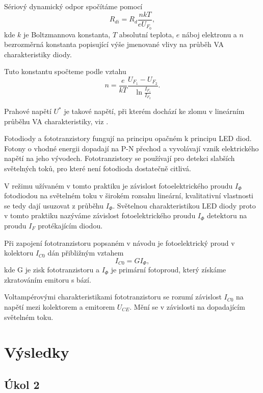 \documentclass{protokol}
\begin{document}
    Sériový dynamický odpor spočítáme pomocí
    \begin{equation} \label{eq:R_di}
      R_{di} = R_d \frac{n k T}{e U_{F_0}},
    \end{equation}
    kde $k$ je Boltzmannova konstanta, $T$ absolutní teplota, $e$ náboj elektronu a $n$ bezrozměrná konstanta popisující výše jmenované vlivy na průběh VA charakteristiky diody.
    
    Tuto konstantu spočteme podle vztahu
    \begin{equation} \label{eq:n}
      n = \frac{e}{kT} \frac{U_{F_1} - U_{F_2}}{\ln \frac{I_{F_1}}{I_{F_2}}}.
    \end{equation}

    Prahové napětí $U^*$ je takové napětí, při kterém dochází ke zlomu v lineárním průběhu VA charakteristiky, viz \cite{teorie}.

    Fotodiody a fototranzistory fungují na principu opačném k principu LED diod. Fotony o vhodné energii dopadají na P-N přechod a vyvolávají vznik elektrického napětí na jeho vývodech. Fototranzistory se používají pro detekci slabších světelných toků, pro které není fotodioda dostatečně citlivá.

    V režimu užívaném v tomto praktiku je závislost fotoelektrického proudu $I_\Phi$ fotodiodou na světelném toku v širokém rozsahu lineární, kvalitativní vlastnosti se tedy dají usuzovat z průběhu $I_\Phi$. Světelnou charakteristikou LED diody proto v tomto praktiku nazýváme závislost fotoelektrického proudu $I_\Phi$ detektoru na proudu $I_F$ protékajícím diodou.

    Při zapojení fototranzistoru popsaném v návodu \cite{navod} je fotoelektrický proud v kolektoru $I_{C0}$ dán přibližným vztahem 
    \begin{equation}
      I_{C0} = G I_\Phi,
    \end{equation}
    kde G je zisk fototranzistoru a $I_\Phi$ je primární fotoproud, který získáme zkratováním emitoru s bází.

    Voltampérovými charakteristikami fototranzistoru se rozumí závislost $I_{C0}$ na napětí mezi kolektorem a emitorem $U_{CE}.$ Mění se v závislosti na dopadajícím světelném toku.

  \section*{Výsledky}

    \subsection*{Úkol 2}
\end{document}

